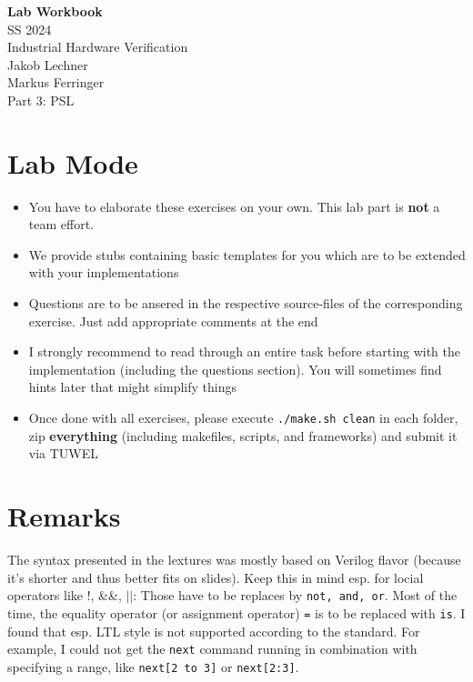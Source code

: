 \documentclass[12pt,epsf,makeidx,oneside]{book}
\begin{document}

\setcounter{tocdepth}{3}
\setcounter{secnumdepth}{3}

\begin{titlepage}
  \begin{center}
    \vspace*{4cm}
    \Huge{\bf Lab Workbook}\\
    \Large{SS 2024}\\
    \vspace{1.5cm}
    \Huge{Industrial Hardware Verification}\\
    \vspace{3cm}
    \Large{
      Jakob Lechner \\
      Markus Ferringer \\
    }
    \vspace*{3cm}
    \Huge{
      Part 3: PSL
    }
  \end{center}
\end{titlepage}

\tableofcontents

\chapter*{Lab Mode}
\begin{itemize}[noitemsep]
  \item You have to elaborate these exercises on your own. This lab part is {\bf not} a team effort.
  \item We provide stubs containing basic templates for you which are to be extended with your implementations
  \item Questions are to be ansered in the respective source-files of the corresponding exercise. Just add appropriate comments at the end
  \item I strongly recommend to read through an entire task before starting with the implementation (including the questions section). You will sometimes find hints later that might simplify things
  \item Once done with all exercises, please execute {\tt ./make.sh clean} in each folder, zip {\bf everything} (including makefiles, scripts, and frameworks) and submit it via TUWEL
\end{itemize}

\chapter*{Remarks}
The syntax presented in the lextures was mostly based on Verilog flavor (because it's shorter and thus better fits on slides). Keep this in mind esp. for locial operators like !, \&\&, $||$: Those have to be replaces by {\tt not, and, or}. Most of the time,
the equality operator (or assignment operator) {\tt =} is to be replaced with {\tt is}.
I found that esp. LTL style is not supported according to the standard. For example, I could not get the {\tt next} command running in combination with specifying a range, like {\tt next[2 to 3]} or {\tt next[2:3]}.
\end{document}
